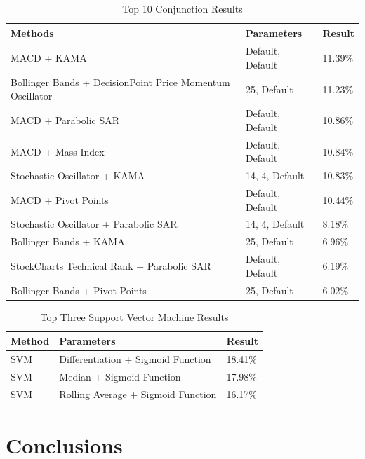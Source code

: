 \documentclass[conference]{IEEEtran}
\begin{document}
\begin{table}
\centering
\begin{tabu}{ |p{4cm}|p{4cm}|p{4cm}|}\hline\hline
Methods & Parameters & Result \\ \hline
MACD + KAMA & Default, Default & 11.39\% \\ \hline
Bollinger Bands + DecisionPoint Price Momentum Oscillator & 25, Default & 11.23\% \\ \hline
MACD + Parabolic SAR & Default, Default & 10.86\% \\ \hline
MACD + Mass Index & Default, Default & 10.84\% \\ \hline
Stochastic Oscillator + KAMA & 14, 4, Default & 10.83\% \\ \hline
MACD + Pivot Points & Default, Default & 10.44\% \\ \hline
Stochastic Oscillator + Parabolic SAR & 14, 4, Default & 8.18\% \\ \hline
Bollinger Bands + KAMA & 25, Default & 6.96\% \\ \hline
StockCharts Technical Rank + Parabolic SAR & Default, Default & 6.19\% \\ \hline
Bollinger Bands + Pivot Points & 25, Default &  6.02\%\\ \hline
\end{tabu}
\vspace{2 mm}
\caption{Top 10 Conjunction Results}
\label{fig: Table Conjunction Results}
\end{table}

\begin{table}
\centering
\begin{tabu}{ |p{4cm}|p{4cm}|p{4cm}|}\hline\hline
Method & Parameters & Result \\ \hline
SVM & Differentiation + Sigmoid Function & 18.41\% \\ \hline
SVM & Median + Sigmoid Function & 17.98\% \\ \hline
SVM & Rolling Average + Sigmoid Function & 16.17\% \\ \hline
\end{tabu}
\vspace{2 mm}
\caption{Top Three Support Vector Machine Results}
\label{fig: Table SVM Results}
\end{table}

\section{Conclusions}
\end{document}
